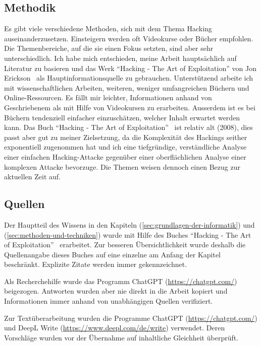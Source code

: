 \documentclass[11pt, a4paper]{article}
\begin{document}
\subsection{Methodik}
Es gibt viele verschiedene Methoden, sich mit dem Thema Hacking auseinanderzusetzen. Einsteigern werden oft Videokurse oder Bücher empfohlen. Die Themenbereiche, auf die sie einen Fokus setzten, sind aber sehr unterschiedlich. Ich habe mich entschieden, meine Arbeit hauptsächlich auf Literatur zu basieren und das Werk ``Hacking - The Art of Exploitation'' von Jon Erickson~\cite{erickson2008hacking} als Hauptinformationsquelle zu gebrauchen. Unterstützend arbeite ich mit wissenschaftlichen Arbeiten, weiteren, weniger umfangreichen Büchern und Online-Ressourcen. Es fällt mir leichter, Informationen anhand von Geschriebenem als mit Hilfe von Videokursen zu erarbeiten. Ausserdem ist es bei Büchern tendenziell einfacher einzuschätzen, welcher Inhalt erwartet werden kann. Das Buch ``Hacking - The Art of Exploitation''~\cite{erickson2008hacking} ist relativ alt (2008), dies passt aber gut zu meiner Zielsetzung, da die Komplexität des Hackings seither exponentiell zugenommen hat und ich eine tiefgründige, verständliche Analyse einer einfachen Hacking-Attacke gegenüber einer oberflächlichen Analyse einer komplexen Attacke bevorzuge. Die Themen weisen dennoch einen Bezug zur aktuellen Zeit auf.

\subsection{Quellen}
Der Hauptteil des Wissens in den Kapiteln  (\ref{sec:grundlagen-der-informatik}) und  (\ref{sec:methoden-und-techniken}) wurde mit Hilfe des Buches ``Hacking - The Art of Exploitation''~\cite{erickson2008hacking} erarbeitet. Zur besseren Übersichtlichkeit wurde deshalb die Quellenangabe dieses Buches auf eine einzelne am Anfang der Kapitel beschränkt. Explizite Zitate werden immer gekennzeichnet. 

Als Recherchehilfe wurde das Programm ChatGPT (\url{https://chatgpt.com/}) beigezogen. Antworten wurden aber nie direkt in die Arbeit kopiert und Informationen immer anhand von unabhängigen Quellen verifiziert.

Zur Textüberarbeitung wurden die Programme ChatGPT (\url{https://chatgpt.com/}) und DeepL Write (\url{https://www.deepl.com/de/write}) verwendet. Deren Vorschläge wurden vor der Übernahme auf inhaltliche Gleichheit überprüft.
\end{document}
